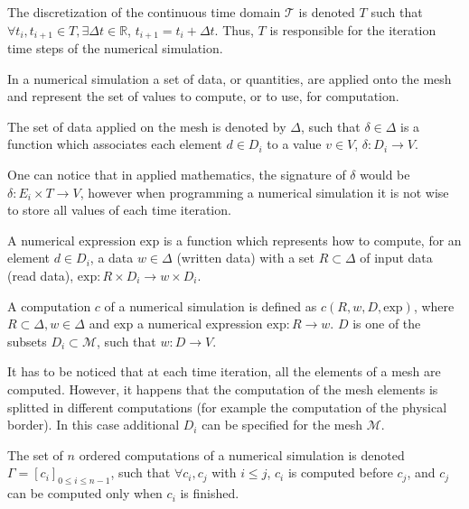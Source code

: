 \begin{mydef}
The discretization of the continuous time domain $\mathcal{T}$ is denoted $T$ such that $\forall t_i, t_{i+1} \in T, \exists \Delta t \in \mathbb{R}$, $t_{i+1} = t_i + \Delta t$. Thus, $T$ is responsible for the iteration time steps of the numerical simulation. 
\end{mydef}

In a numerical simulation a set of data, or quantities, are applied onto the mesh and represent the set of values to compute, or to use, for computation.

\begin{mydef}
The set of data applied on the mesh is denoted by $\Delta$, such that $\delta \in \Delta$ is a function which associates each element $d \in D_i$ to a value $v \in V$, $\delta : D_i \rightarrow V$.
\end{mydef}
One can notice that in applied mathematics, the signature of $\delta$ would be $\delta : E_i \times T \rightarrow V$, however when programming a numerical simulation it is not wise to store all values of each time iteration.

\begin{mydef}
A numerical expression $\text{exp}$ is a function which represents how to compute, for an element $d \in D_i$, a data $w \in \Delta$ (written data) with a set $R \subset \Delta$ of input data (read data), $\text{exp} : R \times D_i \rightarrow w \times D_i$.
\end{mydef}

\begin{mydef}
A computation $c$ of a numerical simulation is defined as $c(R,w,D,\text{exp})$, where $R \subset \Delta, w \in \Delta$ and $\text{exp}$ a numerical expression $\text{exp} : R \rightarrow w$. $D$ is one of the subsets $D_i \subset \mathcal{M}$, such that $w : D \rightarrow V$.
\end{mydef}
It has to be noticed that at each time iteration, all the elements of a mesh are computed. However, it happens that the computation of the mesh elements is splitted in different computations (for example the computation of the physical border). In this case additional $D_i$ can be specified for the mesh $\mathcal{M}$.

\begin{mydef}
The set of $n$ ordered computations of a numerical simulation is denoted $\Gamma = [c_i]_{0 \leq i \leq n-1}$, such that $\forall c_i,c_j$ with $i \leq j$, $c_i$ is computed before $c_j$, and $c_j$ can be computed only when $c_i$ is finished.
\end{mydef}

